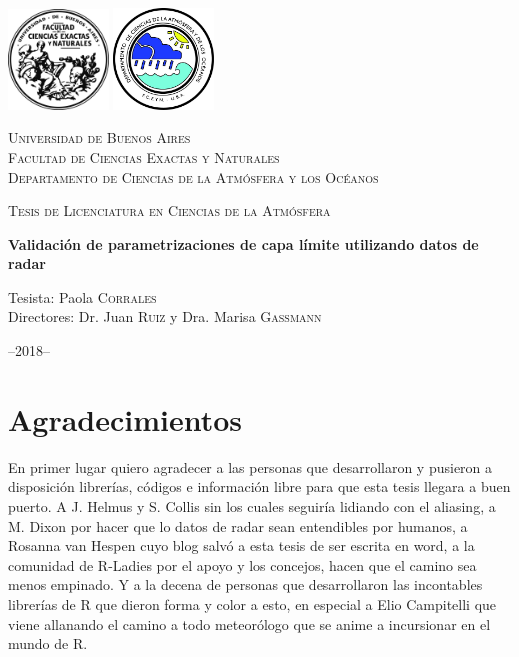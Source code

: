 \documentclass[12pt,spanish,oneside, a4paper]{book}
\title{}
\subtitle{Validación de parametrizaciones de capa límite utilizando datos de radar}
\author{Paola Corrales}
\date{}
\begin{document}
\begin{titlepage}
    \centering
    \includegraphics[width=0.2\textwidth]{logoUBA}  \hfill \includegraphics[width=0.2\textwidth]{logoDCAO} \par
    \vspace{1cm}
    {\scshape\LARGE Universidad de Buenos Aires  \\
    \large Facultad de Ciencias Exactas y Naturales \\
Departamento de Ciencias de la Atmósfera y los Océanos  \par}
    \vspace{0.5cm}
    {\scshape\Large Tesis de Licenciatura en Ciencias de la Atmósfera\par}
    \vspace{1.5cm}
    {\huge\bfseries Validación de parametrizaciones de capa límite utilizando datos de radar\par}
    \vspace{4.5cm}
    {\Large Tesista: Paola \textsc{Corrales} \\
        Directores: Dr. Juan \textsc{Ruiz} y Dra. Marisa \textsc{Gassmann}
    \par}
    \vfill

    {\large --2018--\par}
\end{titlepage}

\renewcommand{\listtablename}{Índice de tablas} 
\renewcommand{\tablename}{Tabla} 

\chapter*{Agradecimientos}

En primer lugar quiero agradecer a las personas que desarrollaron y
pusieron a disposición librerías, códigos e información libre para que
esta tesis llegara a buen puerto. A J. Helmus y S. Collis sin los cuales
seguiría lidiando con el aliasing, a M. Dixon por hacer que lo datos de
radar sean entendibles por humanos, a Rosanna van Hespen cuyo blog salvó
a esta tesis de ser escrita en word, a la comunidad de R-Ladies por el
apoyo y los concejos, hacen que el camino sea menos empinado. Y a la
decena de personas que desarrollaron las incontables librerías de R que
dieron forma y color a esto, en especial a Elio Campitelli que viene
allanando el camino a todo meteorólogo que se anime a incursionar en el
mundo de R.
\end{document}
